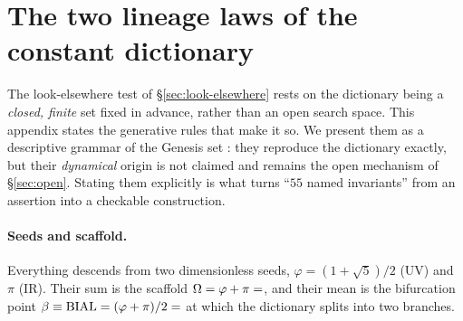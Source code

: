 \documentclass[a4paper,11pt]{article}
\begin{document}
\appendix
\section{The two lineage laws of the constant dictionary}
\label{app:laws}

The look-elsewhere test of \S\ref{sec:look-elsewhere} rests on the dictionary
being a \emph{closed, finite} set fixed in advance, rather than an open search
space. This appendix states the generative rules that make it so. We present
them as a descriptive grammar of the Genesis set
\citep{AlmeidaSSEE2026genesis}: they reproduce the dictionary exactly, but their
\emph{dynamical} origin is not claimed and remains the open mechanism of
\S\ref{sec:open}. Stating them explicitly is what turns ``$55$ named invariants''
from an assertion into a checkable construction.

\paragraph{Seeds and scaffold.} Everything descends from two dimensionless
seeds, $\varphi=(1+\sqrt5)/2$ (UV) and $\pi$ (IR). Their sum is the scaffold
$\Omega=\varphi+\pi=\val{OMEGA_d6}$, and their mean is the bifurcation point
$\beta\equiv\mathrm{BIAL}=(\varphi+\pi)/2=\val{BETA_d6}$ at which the dictionary splits
into two branches.
\end{document}
